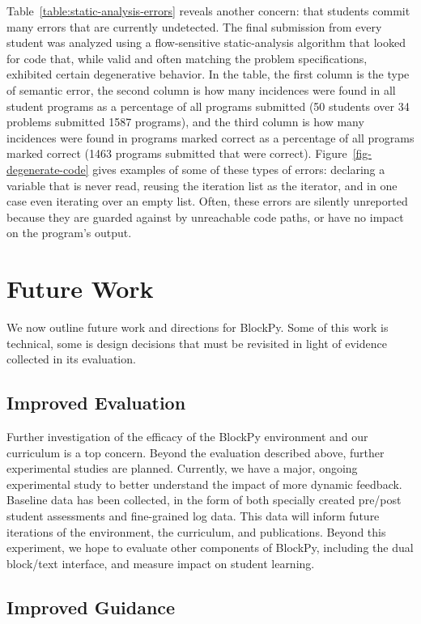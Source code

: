 \documentclass[10pt,journal,compsoc]{IEEEtran}
\begin{document}
Table~\ref{table:static-analysis-errors} reveals another concern: that students commit many errors that are currently undetected.
The final submission from every student was analyzed using a flow-sensitive static-analysis algorithm that looked for code that, while valid and often matching the problem specifications, exhibited certain degenerative behavior.
In the table, the first column is the type of semantic error, the second column is how many incidences were found in all student programs as a percentage of all programs submitted (50 students over 34 problems submitted 1587 programs), and the third column is how many incidences were found in programs marked correct as a percentage of all programs marked correct (1463 programs submitted that were correct).
Figure~\ref{fig-degenerate-code} gives examples of some of these types of errors: declaring a variable that is never read, reusing the iteration list as the iterator, and in one case even iterating over an empty list.
Often, these errors are silently unreported because they are guarded against by unreachable code paths, or have no impact on the program's output.


\section{Future Work}

We now outline future work and directions for BlockPy.
Some of this work is technical, some is design decisions that must be revisited in light of evidence collected in its evaluation.

\subsection{Improved Evaluation}

Further investigation of the efficacy of the BlockPy environment and our curriculum is a top concern.
Beyond the evaluation described above, further experimental studies are planned.
Currently, we have a major, ongoing experimental study to better understand the impact of more dynamic feedback.
Baseline data has been collected, in the form of both specially created pre/post student assessments and fine-grained log data.
This data will inform future iterations of the environment, the curriculum, and publications.
Beyond this experiment, we hope to evaluate other components of BlockPy, including the dual block/text interface, and measure impact on student learning.

\subsection{Improved Guidance}
\end{document}
